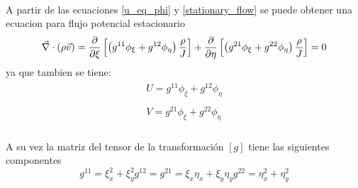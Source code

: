 \documentclass[letterpaper, openright, 12pt]{book}
\begin{document}
    \paragraph*{}
        A partir de las ecuaciones \ref{u_eq_phi} y \ref{stationary_flow} se
        puede obtener una ecuacion para flujo potencial estacionario
        \begin{equation}
            \vec{\nabla} \cdot \left( \rho \vec{v} \right)
                    = \pdv{\xi} \left[ \left(g^{11}\phi_{\xi}
                            + g^{12} \phi_{\eta} \right) \frac{\rho}{J} \right]
                        + \pdv{\eta} \left[ \left(g^{21} \phi_{\xi}
                            + g^{22} \phi_{\eta} \right) \frac{\rho}{J} \right]
                    = 0
        \end{equation}
        ya que tambien se tiene:
        \begin{align}
            \begin{aligned}
            U = g^{11} \phi_{\xi} + g^{12} \phi_{\eta}
            \label{eq_potencial_1}
            \end{aligned}
            \\
            \begin{aligned}
            V = g^{21} \phi_{\xi} + g^{22} \phi_{\eta}
            \label{eq_potencial_2}
            \end{aligned}
        \end{align}

    \paragraph*{}
        A su vez la matriz del tensor de la transformación $[g]$ tiene las
        siguientes componentes
        \begin{subequations}
            \begin{equation}
                g^{11} = \xi_{x}^{2} + \xi_{y}^2
            \end{equation}
            \begin{equation}
                    g^{12} = g^{21} = \xi_{x} \eta_{x} + \xi_{y} \eta_{y}
            \end{equation}
            \begin{equation}
                g^{22} = \eta_{x}^{2} + \eta_{y}^2
            \end{equation}
        \end{subequations}
\end{document}
